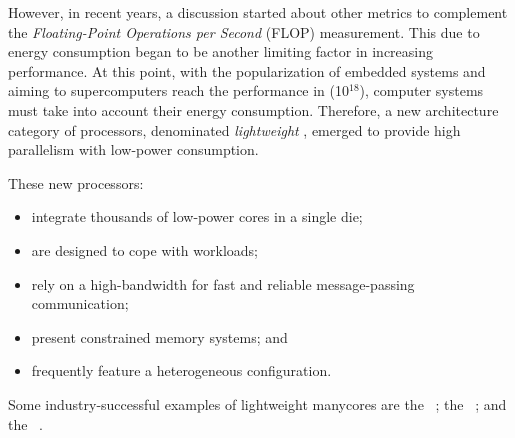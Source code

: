     However, in recent years, a discussion started about other metrics to complement the \textit{Floating-Point Operations per Second} (FLOP) measurement.
    This due to energy consumption began to be another limiting factor in increasing performance.
    At this point, with the popularization of embedded systems and aiming to supercomputers reach the performance in \exascale (10$^{18}$), computer systems must take into account their energy consumption.
    Therefore, a new architecture category of processors, denominated \textit{lightweight} \manycores, emerged to provide high parallelism with low-power consumption.

    These new processors:
    \begin{itemize}
        \item integrate thousands of low-power cores in a single die;
        \item are designed to cope with \mimd workloads;
        \item rely on a high-bandwidth \noc for fast and reliable message-passing communication;
        \item present constrained memory systems; and
        \item frequently feature a heterogeneous configuration.
    \end{itemize}
    Some industry-successful examples of lightweight manycores are
    the \mppa~\cite{DeDinechin2013-1};
    the \epiphany~\cite{Olofsson2014}; and
    the \taihulight~\cite{Zheng2015}.

